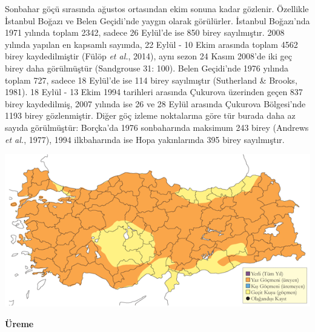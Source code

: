 \documentclass[
  a4paper,
  DIV=11,
  numbers=noendperiod]{scrreprt}
\begin{document}
Sonbahar göçü sırasında ağustos ortasından ekim sonuna kadar gözlenir.
Özellikle İstanbul Boğazı ve Belen Geçidi'nde yaygın olarak görülürler.
İstanbul Boğazı'nda 1971 yılında toplam 2342, sadece 26 Eylül'de ise 850
birey sayılmıştır. 2008 yılında yapılan en kapsamlı sayımda, 22 Eylül -
10 Ekim arasında toplam 4562 birey kaydedilmiştir (Fülöp \emph{et al.},
2014), aynı sezon 24 Kasım 2008'de iki geç birey daha görülmüştür
(Sandgrouse 31: 100). Belen Geçidi'nde 1976 yılında toplam 727, sadece
18 Eylül'de ise 114 birey sayılmıştır (Sutherland \& Brooks, 1981). 18
Eylül - 13 Ekim 1994 tarihleri arasında Çukurova üzerinden geçen 837
birey kaydedilmiş, 2007 yılında ise 26 ve 28 Eylül arasında Çukurova
Bölgesi'nde 1193 birey gözlenmiştir. Diğer göç izleme noktalarına göre
tür burada daha az sayıda görülmüştür: Borçka'da 1976 sonbaharında
maksimum 243 birey (Andrews \emph{et al.}, 1977), 1994 ilkbaharında ise
Hopa yakınlarında 395 birey sayılmıştır.

\includegraphics{images/harita_Page_089.png}

\textbf{Üreme}
\end{document}
